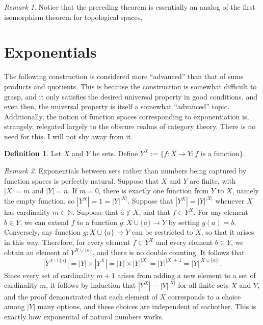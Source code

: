 \documentclass{book}
\theoremstyle{definition}
\newtheorem{definition}{Definition}[section]
\theoremstyle{remark}
\newtheorem{remark}{Remark}[section]
\newcommand{\N}{\mathbb{N}}
\begin{document}
\begin{remark}
Notice that the preceding theorem is essentially an analog of the first isomorphism theorem for topological spaces.
\end{remark}

\iffalse
\section{Exponentials}

The following construction is considered more ``advanced'' than that of sums products and quotients. This is because the construction is somewhat difficult to grasp, and it only satisfies the desired universal property in good conditions, and even then, the universal property is itself a somewhat ``advanced'' topic. Additionally, the notion of function spaces corresponding to exponentiation is, strangely, relegated largely to the obscure realms of category theory. There is no need for this. I will not shy away from it.

\begin{definition}
    Let $X$ and $Y$ be sets. Define $Y^X:=\{f:X\to Y : f\text{ is a function}\}$.
\end{definition}

\begin{remark}
    Exponentials between sets rather than numbers being captured by function spaces is perfectly natural. Suppose that $X$ and $Y$ are finite, with $|X|=m$ and $|Y|=n$. If $m=0$, there is exactly one function from $Y$ to $X$, namely the empty function, so $|Y^X|=1=|Y|^{|X|}$. Suppose that $|Y^X|=|Y|^{|X|}$ whenever $X$ has cardinality $m\in\N$. Suppose that $a\notin X$, and that $f\in Y^X$. For any element $b\in Y$, we can extend $f$ to a function $g:X\cup\{a\}\to Y$ by setting $g(a)=b$. Conversely, any function $g:X\cup\{a\}\to Y$ can be restricted to $X$, so that it arises in this way. Therefore, for every element $f\in Y^X$ and every element $b\in Y$, we obtain an element of $Y^{X\cup\{a\}}$, and there is no double counting. It follows that
        $$|Y^{X\cup\{a\}}|=|Y|\times |Y^X|=|Y|\times |Y|^{|X|}=|Y|^{|X|+1}=|Y|^{|X\cup\{a\}|}.$$
    Since every set of cardinality $m+1$ arises from adding a new element to a set of cardinality $m$, it follows by induction that $|Y^X|=|Y|^{|X|}$ for all finite sets $X$ and $Y$, and the proof demonstrated that each element of $X$ corresponds to a choice among $|Y|$ many options, and these choices are independent of eachother. This is exactly how exponential of natural numbers works. 
\end{remark}
\end{document}
